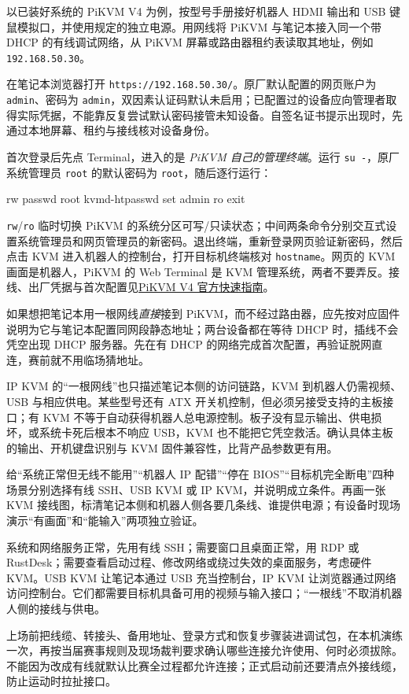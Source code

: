 \begin{example}
以已装好系统的 PiKVM V4 为例，按型号手册接好机器人 HDMI 输出和 USB 键鼠模拟口，并使用规定的独立电源。用网线将 PiKVM 与笔记本接入同一个带 DHCP 的有线调试网络，从 PiKVM 屏幕或路由器租约表读取其地址，例如 \texttt{192.168.50.30}。

在笔记本浏览器打开 \texttt{https://192.168.50.30/}。原厂默认配置的网页账户为 \texttt{admin}、密码为 \texttt{admin}，双因素认证码默认未启用；已配置过的设备应向管理者取得实际凭据，不能靠反复尝试默认密码接管未知设备。自签名证书提示出现时，先通过本地屏幕、租约与接线核对设备身份。

首次登录后先点 Terminal，进入的是 \emph{PiKVM 自己的管理终端}。运行 \texttt{su -}，原厂系统管理员 \texttt{root} 的默认密码为 \texttt{root}，随后逐行运行：
\begin{tbash}
rw
passwd root
kvmd-htpasswd set admin
ro
exit
\end{tbash}
\texttt{rw}/\texttt{ro} 临时切换 PiKVM 的系统分区可写/只读状态；中间两条命令分别交互式设置系统管理员和网页管理员的新密码。退出终端，重新登录网页验证新密码，然后点击 KVM 进入机器人的控制台，打开目标机终端核对 \texttt{hostname}。网页的 KVM 画面是机器人，PiKVM 的 Web Terminal 是 KVM 管理系统，两者不要弄反。接线、出厂凭据与首次配置见\href{https://docs.pikvm.org/v4/}{PiKVM V4 官方快速指南}。

如果想把笔记本用一根网线\emph{直接}接到 PiKVM，而不经过路由器，应先按对应固件说明为它与笔记本配置同网段静态地址；两台设备都在等待 DHCP 时，插线不会凭空出现 DHCP 服务器。先在有 DHCP 的网络完成首次配置，再验证脱网直连，赛前就不用临场猜地址。
\end{example}

IP KVM 的“一根网线”也只描述笔记本侧的访问链路，KVM 到机器人仍需视频、USB 与相应供电。某些型号还有 ATX 开关机控制，但必须另接受支持的主板接口；有 KVM 不等于自动获得机器人总电源控制。板子没有显示输出、供电损坏，或系统卡死后根本不响应 USB，KVM 也不能把它凭空救活。确认具体主板的输出、开机键盘识别与 KVM 固件兼容性，比背产品参数更有用。

\begin{exercise}\label{ex:deploy-kvm}
给“系统正常但无线不能用”“机器人 IP 配错”“停在 BIOS”“目标机完全断电”四种场景分别选择有线 SSH、USB KVM 或 IP KVM，并说明成立条件。再画一张 KVM 接线图，标清笔记本侧和机器人侧各要几条线、谁提供电源；有设备时现场演示“有画面”和“能输入”两项独立验证。
\end{exercise}

\begin{conclusion}
系统和网络服务正常，先用有线 SSH；需要窗口且桌面正常，用 RDP 或 RustDesk；需要查看启动过程、修改网络或绕过失效的桌面服务，考虑硬件 KVM。USB KVM 让笔记本通过 USB 充当控制台，IP KVM 让浏览器通过网络访问控制台。它们都需要目标机具备可用的视频与输入接口；“一根线”不取消机器人侧的接线与供电。
\end{conclusion}

上场前把线缆、转接头、备用地址、登录方式和恢复步骤装进调试包，在本机演练一次，再按当届赛事规则及现场裁判要求确认哪些连接允许使用、何时必须拔除。不能因为改成有线就默认比赛全过程都允许连接；正式启动前还要清点外接线缆，防止运动时拉扯接口。
